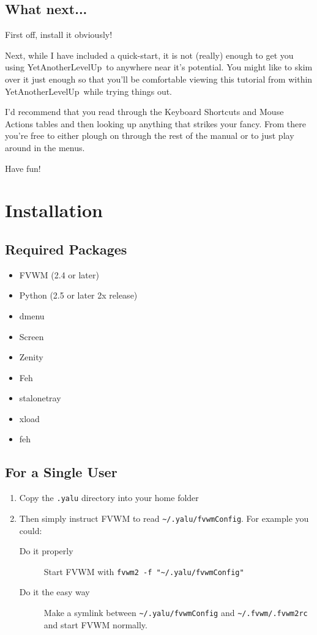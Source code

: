 \documentclass[a4paper,11pt]{article}
\newcommand{\yalu}{YetAnotherLevelUp}
\begin{document}
		\subsection{What next...}
			First off, install it obviously!
			
			Next, while I have included a quick-start, it is not (really) enough to
			get you using \yalu\ to anywhere near it's potential. You might like to
			skim over it just enough so that you'll be comfortable viewing this
			tutorial from within \yalu\ while trying things out.
			
			I'd recommend that you read through the Keyboard Shortcuts and Mouse
			Actions tables and then looking up anything that strikes your fancy. From
			there you're free to either plough on through the rest of the manual or to
			just play around in the menus.
			
			Have fun!
	
	\section{Installation}
		\subsection{Required Packages}
			\begin{itemize}
				\item FVWM (2.4 or later)
				\item Python (2.5 or later 2x release)
				\item dmenu
				\item Screen
				\item Zenity
				\item Feh
				\item stalonetray
				\item xload
				\item feh
			\end{itemize}
		
		\subsection{For a Single User}
			\begin{enumerate}
				\item Copy the \texttt{.yalu} directory into your home folder
				\item Then simply instruct FVWM to read \texttt{\textasciitilde/.yalu/fvwmConfig}. For
					example you could:
					\begin{description}
						\item[Do it properly\texttrademark] Start FVWM with
							\texttt{fvwm2 -f "\textasciitilde/.yalu/fvwmConfig"}
						\item[Do it the easy way] Make a symlink between
							\texttt{\textasciitilde/.yalu/fvwmConfig} and
							\texttt{\textasciitilde/.fvwm/.fvwm2rc} and start FVWM normally.
					\end{description}
			\end{enumerate}
\end{document}
